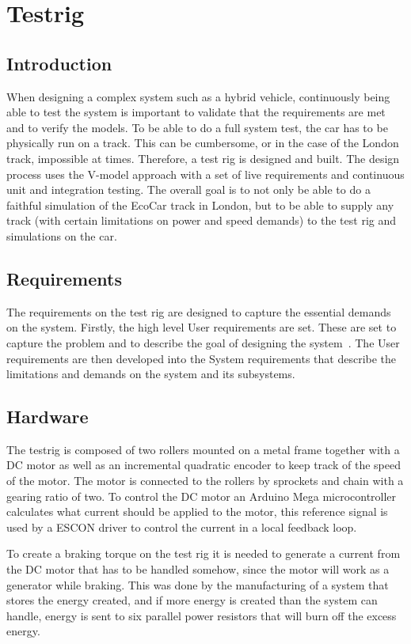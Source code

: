 \chapter{Testrig}
\section{Introduction}
When designing a complex system such as a hybrid vehicle, continuously being
able to test the system is important to validate that the requirements are met
and to verify the models. To be able to do a full system test, the car has to be
physically run on a track. This can be cumbersome, or in the case of the London
track, impossible at times. Therefore, a test rig is designed and built. The
design process uses the V-model approach with a set of live requirements and
continuous unit and integration testing. The overall goal is to not only be able
to do a faithful simulation of the EcoCar track in London, but to be able to
supply any track (with certain limitations on power and speed demands) to the
test rig and simulations on the car.

\section{Requirements}
The requirements on the test rig are designed to capture the essential demands
on the system. Firstly, the high level User requirements are set. These are set
to capture the problem and to describe the goal of designing the
system~\cite{ibm_req}. The User requirements are then developed into the System
requirements that describe the limitations and demands on the system and its
subsystems.

\section{Hardware}
The testrig is composed of two rollers mounted on a metal frame together with a
DC motor as well as an incremental quadratic encoder to keep track of the speed
of the motor. The motor is connected to the rollers by sprockets and chain with
a gearing ratio of two. To control the DC motor an Arduino Mega microcontroller
calculates what current should be applied to the motor, this reference signal
is used by a ESCON driver to control the current in a local feedback loop.

To create a braking torque on the test rig it is needed to generate a current
from the DC motor that has to be handled somehow, since the motor will work as
a generator while braking. This was done by the manufacturing of a system that
stores the energy created, and if more energy is created than the system can
handle, energy is sent to six parallel power resistors that will burn off the
excess energy. 

